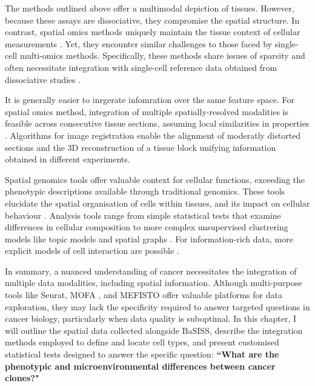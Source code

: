 The methods outlined above offer a multimodal depiction of tissues. However, because these assays are dissociative, they compromise the spatial structure. In contrast, spatial omics methods uniquely maintain the tissue context of cellular measurements . Yet, they encounter similar challenges to those faced by single-cell multi-omics methods. Specifically, these methods share issues of sparsity and often necessitate integration with single-cell reference data obtained from dissociative studies . 

It is generally easier to inrgerate infomration over the same feature space. For spatial omics method, integration of multiple spatially-resolved modalities is feasible across consecutive tissue sections, assuming local similarities in properties . Algorithms for image registration enable the alignment of moderatly distorted sections and the 3D reconstruction of a tissue block \parencite{Kiemen2020-dc} unifying information obtained in different experiments. 

Spatial genomics tools offer valuable context for cellular functions, exceeding the phenotypic descriptions available through traditional genomics. These tools elucidate the spatial organisation of cells within tissues, and its impact on cellular behaviour . Analysis tools range from simple statistical tests that examine differences in cellular composition to more complex unsupervised clustrering models like topic models \parencite{Nirmal2022-sq} and spatial graphs \parencite{Danenberg2022-zb}. For information-rich data, more explicit models of cell interaction are possible \parencite{Fischer2023-go}.

In summary, a nuanced understanding of cancer necessitates the integration of multiple data modalities, including spatial information. Although multi-purpose tools like Seurat, MOFA \parencite{Argelaguet2018-oz}, and MEFISTO \parencite{Velten2022-gc} offer valuable platforms for data exploration, they may lack the specificity required to answer targeted questions in cancer biology, particularly when data quality is suboptimal. In this chapter, I will outline the spatial data collected alongside \ac{BaSISS}, describe the integration methods employed to define and locate cell types, and present customised statistical tests designed to answer the specific question: \textbf{``What are the phenotypic and microenvironmental differences between cancer clones?"}

